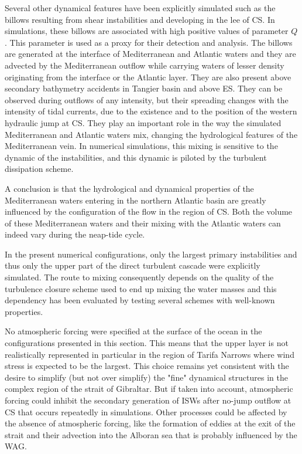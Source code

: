Several other dynamical features have been explicitly simulated such as the billows resulting from shear instabilities and developing in the lee of CS. In simulations, these billows are associated with high positive values of parameter $Q$. This parameter is used as a proxy for their detection and analysis. The billows are generated at the interface of Mediterranean and Atlantic waters and they are advected by the Mediterranean outflow while carrying waters of lesser density originating from the interface or the Atlantic layer. They are also present above secondary bathymetry accidents in Tangier basin and above ES. They can be observed during outflows of any intensity, but their spreading changes with the intensity of tidal currents, due to the existence and to the position of the western hydraulic jump at CS. They play an important role in the way the simulated Mediterranean and Atlantic waters mix, changing the hydrological features of the Mediterranean vein. In numerical simulations, this mixing is sensitive to the dynamic of the instabilities, and this dynamic is piloted by the turbulent dissipation scheme.

A conclusion is that the hydrological and dynamical properties of the Mediterranean waters entering in the northern Atlantic basin are greatly influenced by the configuration of the flow in the region of CS. Both the volume of these Mediterranean waters and their mixing with the Atlantic waters can indeed vary during the neap-tide cycle. 

In the present numerical configurations, only the largest primary instabilities and thus only the upper part of the direct turbulent cascade were explicitly simulated. The route to mixing consequently depends on the quality of the turbulence closure scheme used to end up mixing the water masses and this dependency has been evaluated by testing several schemes with well-known properties. 

No atmospheric forcing were specified at the surface of the ocean in the configurations presented in this section. This means that the upper layer is not realistically represented in particular in the region of Tarifa Narrows where wind stress is expected to be the largest. This choice remains yet consistent with the desire to simplify (but not over simplify) the "fine" dynamical structures in the complex region of the strait of Gibraltar. But if taken into account, atmospheric forcing could inhibit the secondary generation of ISWs after no-jump outflow at CS that occurs repeatedly in simulations. Other processes could be affected by the absence of atmospheric forcing, like the formation of eddies at the exit of the strait and their advection into the Alboran sea that is probably influenced by the WAG.

